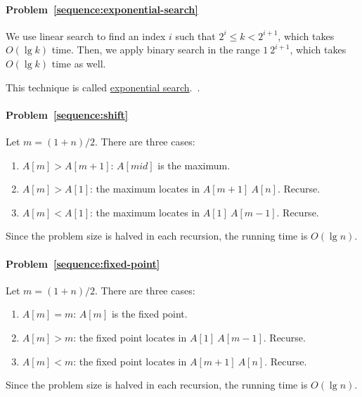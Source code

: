 \begin{Answer}
\paragraph{Problem~\ref{sequence:exponential-search}}
We use linear search to find an index $i$ such that $2^i \leq k < 2^{i+1}$, which takes $O(\lg k)$ time.
Then, we apply binary search in the range $1 ~ 2^{i + 1}$, which takes $O(\lg k)$ time as well.

This technique is called \href{https://en.wikipedia.org/wiki/Exponential_search}{exponential search}.~\cite{Bentley1976}.

\paragraph{Problem~\ref{sequence:shift}}
Let $m = (1 + n)/2$. There are three cases:
\begin{enumerate}
\item $A[m] > A[m+1]$: $A[mid]$ is the maximum.
\item $A[m] > A[1]$: the maximum locates in $A[m + 1] ~ A[n]$. Recurse.
\item $A[m] < A[1]$: the maximum locates in $A[1] ~ A[m-1]$. Recurse.
\end{enumerate}
Since the problem size is halved in each recursion, the running time is $O(\lg n)$.

\paragraph{Problem~\ref{sequence:fixed-point}}
Let $m = (1 + n)/2$. There are three cases:
\begin{enumerate}
\item $A[m] = m$: $A[m]$ is the fixed point.
\item $A[m] > m$: the fixed point locates in $A[1] ~ A[m - 1]$. Recurse.
\item $A[m] < m$: the fixed point locates in $A[m + 1] ~ A[n]$. Recurse.
\end{enumerate}
Since the problem size is halved in each recursion, the running time is $O(\lg n)$.

\end{Answer}

